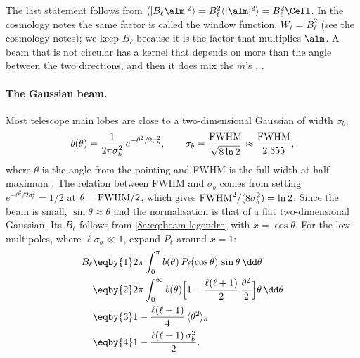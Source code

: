 The last statement follows from $\langle|B_\ell\alm|^2\rangle=B_\ell^2\langle|\alm|^2\rangle=
B_\ell^2\Cell$. In the cosmology notes the same factor is called the window function,
$W_\ell=B_\ell^2$ (see the cosmology notes); we keep $B_\ell$ because it is the factor that
multiplies $\alm$. A beam that is not circular has a kernel that depends on more than the
angle between the two directions, and then it does mix the $m$'s
, .

\paragraph{The Gaussian beam.}
Most telescope main lobes are close to a two-dimensional Gaussian of width $\sigma_b$,
\begin{equation}
  b(\theta)=\frac{1}{2\pi\sigma_b^2}\,e^{-\theta^2/2\sigma_b^2},
  \qquad
  \sigma_b=\frac{\rm FWHM}{\sqrt{8\ln2}}\approx\frac{\rm FWHM}{2.355},
  \label{8a:eq:gauss-beam}
\end{equation}
where $\theta$ is the angle from the pointing and FWHM is the full width at half maximum
.
The relation between FWHM and $\sigma_b$ comes from setting $e^{-\theta^2/2\sigma_b^2}=1/2$
at $\theta={\rm FWHM}/2$, which gives ${\rm FWHM}^2/(8\sigma_b^2)=\ln 2$. Since the beam is
small, $\sin\theta\approx\theta$ and the normalisation is that of a flat two-dimensional
Gaussian. Its $B_\ell$ follows from \eqref{8a:eq:beam-legendre} with $x=\cos\theta$. For the
low multipoles, where $\ell\sigma_b\ll1$, expand $P_\ell$ around $x=1$:
\begin{align}
  B_\ell
  &\eqby{1}2\pi\int_0^{\pi}b(\theta)\,P_\ell(\cos\theta)\,\sin\theta\,\dd\theta \nonumber\\
  &\eqby{2}2\pi\int_0^{\infty}b(\theta)\Bigl[1-\frac{\ell(\ell+1)}{2}\,\frac{\theta^2}{2}\Bigr]\theta\,\dd\theta \nonumber\\
  &\eqby{3}1-\frac{\ell(\ell+1)}{4}\,\langle\theta^2\rangle_b \nonumber\\
  &\eqby{4}1-\frac{\ell(\ell+1)\,\sigma_b^2}{2} .
  \label{8a:eq:beam-small}
\end{align}

